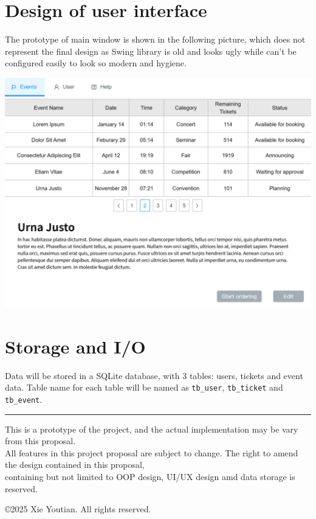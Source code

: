 \documentclass{article}
\begin{document}
\pagebreak

\section{Design of user interface}
The prototype of main window is shown in the following picture, which does not represent the final design as Swing library is old and looks ugly while can't be configured easily to look so modern and hygiene.

\includegraphics[width=\textwidth]{Main Window.pdf}
\section{Storage and I/O}
Data will be stored in a SQLite database, with 3 tables: users, tickets and event data. Table name for each table will be named as \verb|tb_user|, \verb|tb_ticket| and \verb|tb_event|.
\\
\hrule

\begin{center}
    This is a prototype of the project, and the actual implementation may be vary from this proposal.\\ 
    All features in this project proposal are subject to change.
    The right to amend the design contained in this proposal, \\containing but not limited to OOP design, UI/UX design amd data storage is reserved.

    \copyright 2025 Xie Youtian. All rights reserved.
\end{center}
\end{document}
